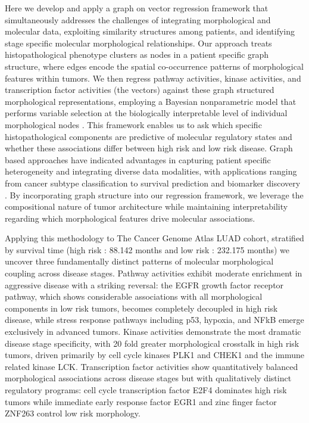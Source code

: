 \documentclass[pdflatex,article,12pt]{article}
\begin{document}
Here we develop and apply a graph on vector regression framework that simultaneously addresses the challenges of integrating morphological and molecular data, exploiting similarity structures among patients, and identifying stage specific molecular morphological relationships. Our approach treats histopathological phenotype clusters as nodes in a patient specific graph structure, where edges encode the spatial co-occurrence patterns of morphological features within tumors. We then regress pathway activities, kinase activities, and transcription factor activities (the vectors) against these graph structured morphological representations, employing a Bayesian nonparametric model that performs variable selection at the biologically interpretable level of individual morphological nodes \cite{george1993variable, hoff2002latent, liang2013mixtures,  wang2017bayesian, ma2022semi, bhadury2023fast}. This framework enables us to ask which specific histopathological components are predictive of molecular regulatory states and whether these associations differ between high risk and low risk disease. Graph based approaches have indicated advantages in capturing patient specific heterogeneity and integrating diverse data modalities, with applications ranging from cancer subtype classification to survival prediction and biomarker discovery \cite{valous2024graph,li2024multimodal,liu2024geometric}. By incorporating graph structure into our regression framework, we leverage the compositional nature of tumor architecture while maintaining interpretability regarding which morphological features drive molecular associations.

Applying this methodology to The Cancer Genome Atlas LUAD cohort, stratified by survival time (high risk : 88.142 months and low risk : 232.175 months) we uncover three fundamentally distinct patterns of molecular morphological coupling across disease stages. Pathway activities exhibit moderate enrichment in aggressive disease with a striking reversal: the EGFR growth factor receptor pathway, which shows considerable associations with all morphological components in low risk tumors, becomes completely decoupled in high risk disease, while stress response pathways including p53, hypoxia, and NFkB emerge exclusively in advanced tumors. Kinase activities demonstrate the most dramatic disease stage specificity, with 20 fold greater morphological crosstalk in high risk tumors, driven primarily by cell cycle kinases PLK1 and CHEK1 and the immune related kinase LCK. Transcription factor activities show quantitatively balanced morphological associations across disease stages but with qualitatively distinct regulatory programs: cell cycle transcription factor E2F4 dominates high risk tumors while immediate early response factor EGR1 and zinc finger factor ZNF263 control low risk morphology.
\end{document}
